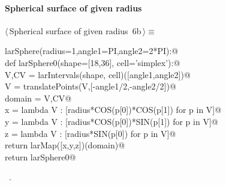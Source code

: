\documentclass[11pt,oneside]{article}	%
\begin{document}
\paragraph{Spherical surface of given radius}
\begin{flushleft} \small \label{scrap10}
\protect{}$\langle\,$Spherical surface of given radius\nobreak\ {\footnotesize 6b}$\,\rangle\equiv$
\vspace{-1ex}
\begin{list}{}{} \item
\mbox{}\verb@def larSphere(radius=1,angle1=PI,angle2=2*PI):@\\
\mbox{}\verb@   def larSphere0(shape=[18,36], cell='simplex'):@\\
\mbox{}\verb@      V,CV = larIntervals(shape, cell)([angle1,angle2])@\\
\mbox{}\verb@      V = translatePoints(V,[-angle1/2,-angle2/2])@\\
\mbox{}\verb@      domain = V,CV@\\
\mbox{}\verb@      x = lambda V : [radius*COS(p[0])*COS(p[1]) for p in V]@\\
\mbox{}\verb@      y = lambda V : [radius*COS(p[0])*SIN(p[1]) for p in V]@\\
\mbox{}\verb@      z = lambda V : [radius*SIN(p[0]) for p in V]@\\
\mbox{}\verb@      return larMap([x,y,z])(domain)@\\
\mbox{}\verb@   return larSphere0@\\
\mbox{}\verb@@{\NWsep}
\end{list}
\vspace{-1ex}
\footnotesize\addtolength{\baselineskip}{-1ex}
\begin{list}{}{\setlength{\itemsep}{-\parsep}\setlength{\itemindent}{-\leftmargin}}
\item \NWtxtMacroRefIn\ .
\end{list}
\end{flushleft}
\end{document}
